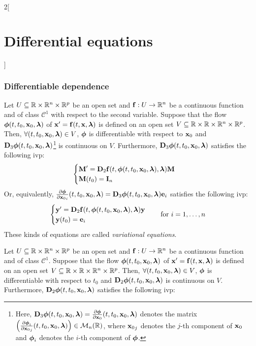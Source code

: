 \documentclass[../../../main_math.tex]{subfiles}
\begin{document}
\begin{multicols}{2}[\section{Differential equations}]
  \subsubsection{Differentiable dependence}
  \begin{theorem}[Dependence on $\vf{x}_0$]
    Let $U\subseteq\RR\times\RR^n\times\RR^p$ be an open set and $\vf{f}:U\rightarrow\RR^n$ be a continuous function and of class $\mathcal{C}^1$ with respect to the second variable. Suppose that the flow $\vf{\phi}(t,t_0,\vf{x}_0,\vf{\lambda})$ of $\vf{x}'=\vf{f}(t,\vf{x},\vf{\lambda})$ is defined on an open set $V\subseteq\RR\times\RR\times\RR^n\times\RR^p$. Then, $\forall (t,t_0,\vf{x}_0,\vf{\lambda})\in V$, $\vf{\phi}$ is differentiable with respect to $\vf{x}_0$ and $\vf{D}_3\vf{\phi}(t,t_0,\vf{x}_0,\vf{\lambda})$\footnote{Here, $\vf{D}_3\vf{\phi}(t,t_0,\vf{x}_0,\vf{\lambda})=\frac{\partial\vf{\phi}}{\partial \vf{x}_0}(t,t_0,\vf{x}_0,\vf{\lambda})$ denotes the matrix $\left(\frac{\partial\vf{\phi}_i}{\partial{\vf{x}_0}_j}(t,t_0,\vf{x}_0,\vf{\lambda})\right)\in\mathcal{M}_n(\RR)$, where ${\vf{x}_0}_j$ denotes the $j$-th component of $\vf{x}_0$ and $\vf{\phi}_i$ denotes the $i$-th component of $\vf{\phi}$.} is continuous on $V$. Furthermore, $\vf{D}_3\vf{\phi}(t,t_0,\vf{x}_0,\vf{\lambda})$ satisfies the following ivp:
    \begin{equation*}
      \begin{cases}
        \vf{M}'      =\vf{D}_2\vf{f}(t,\vf{\phi}(t,t_0,\vf{x}_0,\vf{\lambda}),\vf{\lambda})\vf{M} \\
        \vf{M}(t_0)  =\vf{I}_n
      \end{cases}
    \end{equation*}
    Or, equivalently, $\frac{\partial\vf{\phi}}{\partial {\vf{x}_0}_i}(t,t_0,\vf{x}_0,\vf{\lambda})=\vf{D}_3\vf{\phi}(t,t_0,\vf{x}_0,\vf{\lambda})\vf{e}_i$ satisfies the following ivp:
    $$
      \begin{cases}
        \vf{y}'      =\vf{D}_2\vf{f}(t,\vf{\phi}(t,t_0,\vf{x}_0,\vf{\lambda}),\vf{\lambda})\vf{y} \\
        \vf{y}(t_0)  =\vf{e}_i
      \end{cases}\quad\text{for }i=1,\ldots,n
    $$
    These kinds of equations are called \emph{variational equations}.
  \end{theorem}
  \begin{theorem}[Dependence on $t_0$]
    Let $U\subseteq\RR\times\RR^n\times\RR^p$ be an open set and $\vf{f}:U\rightarrow\RR^n$ be a continuous function and of class $\mathcal{C}^1$. Suppose that the flow $\vf{\phi}(t,t_0,\vf{x}_0,\vf{\lambda})$ of $\vf{x}'=\vf{f}(t,\vf{x},\vf{\lambda})$ is defined on an open set $V\subseteq\RR\times\RR\times\RR^n\times\RR^p$. Then, $\forall (t,t_0,\vf{x}_0,\vf{\lambda})\in V$, $\vf{\phi}$ is differentiable with respect to $t_0$ and $\vf{D}_2\vf{\phi}(t,t_0,\vf{x}_0,\vf{\lambda})$ is continuous on $V$. Furthermore, $\vf{D}_2\vf{\phi}(t,t_0,\vf{x}_0,\vf{\lambda})$ satisfies the following ivp:

\end{theorem}
\end{multicols}
\end{document}
